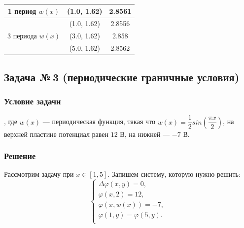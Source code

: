 \documentclass[12pt, a4paper]{article}
\renewcommand{\phi}{\varphi}
\begin{document}
\begin{enumerate}
\begin{table}[!h]
\begin{tabular}{|c|c|c|}
							
							\hline
							\hline
							
							1 период $w(x)$                   
							& (1.0, 1.62)                                                      
							& 2.8561           \\ \hline
							\multirow{3}{*}{3 периода $w(x)$} 
							& (1.0, 1.62)                                                      
							& 2.8556           \\ \cline{2-3} 
							& (3.0, 1.62)                                                      
							& 2.858            \\ \cline{2-3} 
							& (5.0, 1.62)                                                      
							& 2.8562           \\ \hline					
							
							
							
						\end{tabular}
					\end{table}
				
				\end{enumerate}
				
				
			
	\newpage
	\subsection{Задача №\,3 (периодические граничные условия)}
		\subsubsection{Условие задачи}
			, где $w(x)$ --- периодическая функция, такая что $w(x) = \dfrac{1}{2} sin \left(\dfrac{\pi x}{2} \right)$, на верхней пластине потенциал равен $12$ В, на нижней --- $-7$ В.
		\subsubsection{Решение}
			Рассмотрим задачу при $x \in \left[ 1, 5 \right]$. Запишем систему, которую нужно решить:
			\begin{equation*}
				\begin{cases}
					\Delta \phi (x, y)  = 0, \\
					\phi (x, 2) = 12, \\
					\phi (x, w(x)) = -7, \\
					\phi (1, y) = \phi (5, y).\\
				\end{cases}
			\end{equation*}
			
\end{document}
